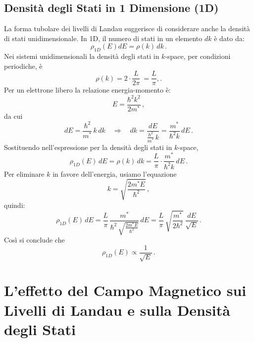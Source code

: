 \subsection*{Densità degli Stati in 1 Dimensione (1D)}

La forma tubolare dei livelli di Landau suggerisce di considerare anche la densità di stati unidimensionale.  
In 1D, il numero di stati in un elemento \(dk\) è dato da:
\[
\rho_{1D}(E)dE = \rho(k)\, dk\,.
\]
Nei sistemi unidimensionali la densità degli stati in \(k\)-space, per condizioni periodiche, è 
\[
\rho(k) = 2\cdot \frac{L}{2\pi}\ = \frac{L}{\pi},.
\]
Per un elettrone libero la relazione energia-momento è:
\[
E = \frac{\hbar^2 k^2}{2m^*}\,,
\]
da cui
\[
dE = \frac{\hbar^2}{m^*}\, k\, dk \quad \Longrightarrow \quad dk = \frac{dE}{\frac{\hbar^2}{m^*}\, k} = \frac{m^*}{\hbar^2 k}\, dE\,.
\]
Sostituendo nell'espressione per la densità degli stati in \(k\)-space,
\[
\rho_{1D}(E)\, dE = \rho(k) \, dk = \frac{L}{\pi} \cdot \frac{m^*}{\hbar^2 k}\, dE\,.
\]
Per eliminare \(k\) in favore dell'energia, usiamo l'equazione
\[
k = \sqrt{\frac{2m^* E}{\hbar^2}}\,,
\]
quindi:
\[
\rho_{1D}(E)\, dE = \frac{L}{\pi}\, \frac{m^*}{\hbar^2\, \sqrt{\frac{2m^* E}{\hbar^2}}}\, dE
=  \frac{L}{\pi}\, \sqrt{\frac{m^*}{2\hbar^2}}\, \frac{dE}{\sqrt{E}}\,.
\]
Così si conclude che
\[
\rho_{1D}(E) \propto \frac{1}{\sqrt{E}}\,.
\]

\section{L'effetto del Campo Magnetico sui Livelli di Landau e sulla Densità degli Stati}

